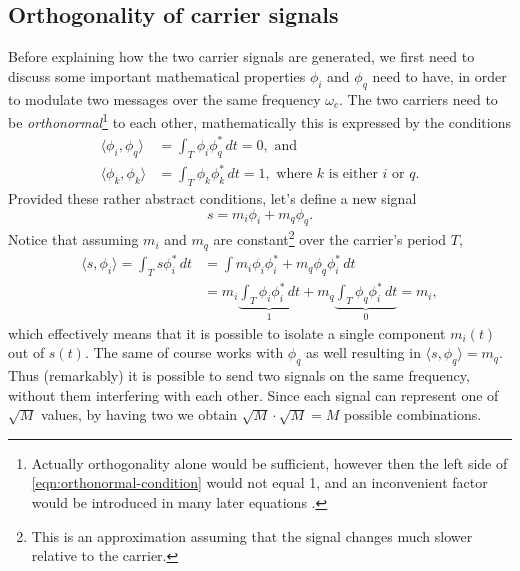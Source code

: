 \subsection{Orthogonality of carrier signals}

Before explaining how the two carrier signals are generated, we first need to discuss some important mathematical properties \(\phi_i\) and \(\phi_q\) need to have, in order to modulate two messages over the same frequency \(\omega_c\). The two carriers need to be \emph{orthonormal}\footnote{Actually orthogonality alone would be sufficient, however then the left side of \eqref{eqn:orthonormal-condition} would not equal 1, and an inconvenient factor would be introduced in many later equations \cite{Gallager,Hsu}.} to each other, mathematically this is expressed by the conditions
\begin{subequations} \label{eqn:orthonormal-conditions}
	\begin{align}
		\langle \phi_i, \phi_q \rangle
			&= \int_T \phi_i \phi_q^* \, dt
			= 0, \text{ and } \label{eqn:orthogonal-condition} \\
		\langle \phi_k, \phi_k \rangle
			&= \int_T \phi_k \phi_k^*  \,dt = 1,
			\text{ where } k \text{ is either } i \text{ or } q. \label{eqn:orthonormal-condition}
	\end{align}
\end{subequations}
Provided these rather abstract conditions, let's define a new signal 
\begin{equation}
	s = m_i\phi_i + m_q\phi_q.
\end{equation}
Notice that assuming \(m_i\) and \(m_q\) are constant\footnote{This is an approximation assuming that the signal changes much slower relative to the carrier.} over the carrier's period \(T\),
\begin{align*}
	\langle s, \phi_i \rangle = \int_T s \phi_i^* \,dt
		&= \int m_i \phi_i \phi_i^* + m_q \phi_q \phi_i^* \,dt \\
		&= m_i \underbrace{\int_T \phi_i \phi_i^* \,dt}_{1}
			+ m_q \underbrace{\int_T \phi_q \phi_i^* \,dt}_{0} = m_i,
\end{align*}
which effectively means that it is possible to isolate a single component \(m_i(t)\) out of \(s(t)\). The same of course works with \(\phi_q\) as well resulting in \(\langle s, \phi_q \rangle = m_q\). Thus (remarkably) it is possible to send two signals on the same frequency, without them interfering with each other. Since each signal can represent one of \(\sqrt{M}\) values, by having two we obtain \(\sqrt{M} \cdot \sqrt{M} = M\) possible combinations.

